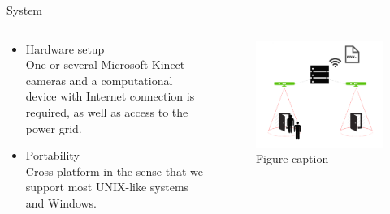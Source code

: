 \documentclass[final,hyperref={pdfpagelabels=false}]{beamer}
\begin{document}
\begin{frame}[t]
\begin{columns}[t]
\begin{column}{.465\textwidth}


\begin{block}{System}

\begin{columns} %
\begin{column}{.54\textwidth} %
\begin{itemize}
\item Hardware setup\\
One or several Microsoft Kinect cameras and a computational device with Internet connection is required, as well as access to the power grid.
\item Portability\\
Cross platform in the sense that we support most UNIX-like systems and Windows.
\end{itemize}
\end{column}

\begin{column}{.43\textwidth} %
\centering
\begin{figure}
\includegraphics[width=1.0\linewidth]{system_overview.png}
\caption{Figure caption}
\end{figure}
\end{column}
\end{columns} %


\end{block}
\end{column}
\end{columns}
\end{frame}
\end{document}
